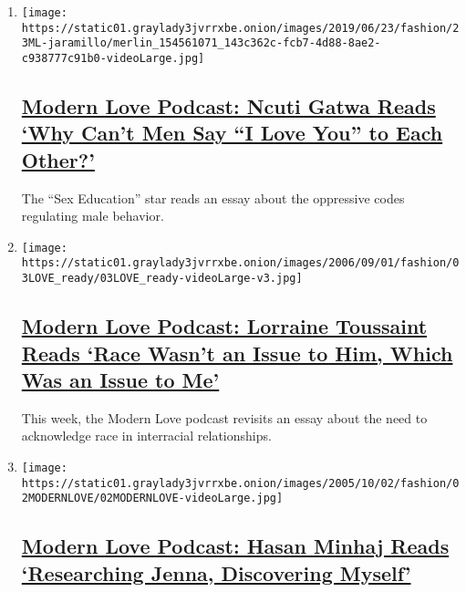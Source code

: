 \begin{enumerate}
\def\labelenumi{\arabic{enumi}.}
\item
  \texttt{[image: https://static01.graylady3jvrrxbe.onion/images/2019/06/23/fashion/23ML-jaramillo/merlin\_154561071\_143c362c-fcb7-4d88-8ae2-c938777c91b0-videoLarge.jpg]}

  \hypertarget{modern-love-podcast-ncuti-gatwa-reads-why-cant-men-say-i-love-you-to-each-other}{%
  \subsection{\texorpdfstring{\href{/2020/06/17/style/modern-love-podcast-ncuti-gatwa.html}{Modern
  Love Podcast: Ncuti Gatwa Reads `Why Can't Men Say ``I Love You'' to
  Each
  Other?'}}{Modern Love Podcast: Ncuti Gatwa Reads `Why Can't Men Say ``I Love You'' to Each Other?'}}\label{modern-love-podcast-ncuti-gatwa-reads-why-cant-men-say-i-love-you-to-each-other}}

  The ``Sex Education'' star reads an essay about the oppressive codes
  regulating male behavior.
\item
  \texttt{[image: https://static01.graylady3jvrrxbe.onion/images/2006/09/01/fashion/03LOVE\_ready/03LOVE\_ready-videoLarge-v3.jpg]}

  \hypertarget{modern-love-podcast-lorraine-toussaint-reads-race-wasnt-an-issue-to-him-which-was-an-issue-to-me}{%
  \subsection{\texorpdfstring{\href{/2020/06/10/style/modern-love-podcast-lorraine-toussant-updated-poscript.html}{Modern
  Love Podcast: Lorraine Toussaint Reads `Race Wasn't an Issue to Him,
  Which Was an Issue to
  Me'}}{Modern Love Podcast: Lorraine Toussaint Reads `Race Wasn't an Issue to Him, Which Was an Issue to Me'}}\label{modern-love-podcast-lorraine-toussaint-reads-race-wasnt-an-issue-to-him-which-was-an-issue-to-me}}

  This week, the Modern Love podcast revisits an essay about the need to
  acknowledge race in interracial relationships.
\item
  \texttt{[image: https://static01.graylady3jvrrxbe.onion/images/2005/10/02/fashion/02MODERNLOVE/02MODERNLOVE-videoLarge.jpg]}

  \hypertarget{modern-love-podcast-hasan-minhaj-reads-researching-jenna-discovering-myself}{%
  \subsection{\texorpdfstring{\href{/2020/06/03/style/modern-love-podcast-hasan-minhaj.html}{Modern
  Love Podcast: Hasan Minhaj Reads `Researching Jenna, Discovering
  Myself'}}{Modern Love Podcast: Hasan Minhaj Reads `Researching Jenna, Discovering Myself'}}\label{modern-love-podcast-hasan-minhaj-reads-researching-jenna-discovering-myself}}


\end{enumerate}

